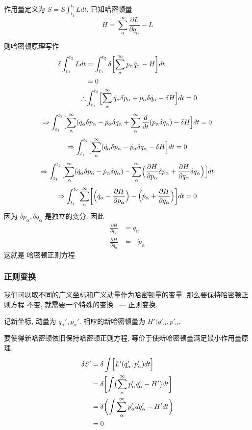 \documentclass{ctexart}
\begin{document}
作用量定义为 $S = S \int_{t_1}^{t_2} L dt$. 已知哈密顿量 
\[
H = \sum_{\alpha }^{\infty} \frac{\partial L}{\partial \dot{q}_\alpha} - L  
\] 

则哈密顿原理写作
\[
    \begin{align*}
        \delta \int_{t_1}^{t_2} Ldt 
	&= \int_{t_1}^{t_2} \delta \biggl[ \sum_{\alpha}^{\infty} 
	p_\alpha \dot{q}_\alpha - H \biggr] dt \\
	&= 0 \\ 
	\therefore &\int_{t_1}^{t_2} \Bigl[ \sum_{\alpha}^{\infty} 
	\dot{q}_\alpha \delta p_\alpha + p_\alpha \delta \dot{q}_\alpha 
    - \delta H \Bigr] dt =  0 \\ 
    \end{align*}
\] 
\[
\Rightarrow \int_{t_1}^{t_2} \Bigl[ \sum_{\alpha}^{\infty}
(\dot{q}_\alpha \delta p_\alpha - \dot{p}_\alpha \delta q_\alpha
+ \sum_{\alpha}^{\infty} \frac{d}{dt} (p_\alpha \delta q_\alpha ) - \delta H
\Bigr] dt =0
\] 
\[
\Rightarrow  \int_{t_1}^{t_2} \Bigl[ \sum_{\alpha}^{\infty} (\dot{q}_\alpha
\delta p_\alpha - \dot{p}_\alpha \delta q_\alpha - \delta H \Bigr]  dt 
=0
\] 
\[
\Rightarrow  \int_{t_1}^{t_2} \Bigl[ 
\sum_{\alpha}^{\infty}(\dot{q}_\alpha \delta p_\alpha - \dot{p}_\alpha \delta
q_\alpha ) 
- \sum_{\alpha}^{\infty} \Bigl( 
\frac{\partial H}{\partial p_\alpha} \delta p_\alpha + 
\frac{\partial H}{\partial q_\alpha} \delta q_\alpha 
\Bigr) 
\Bigr] dt 
\] 
\[
\Rightarrow \int_{t_1}^{t_2} 
\sum_{\alpha}^{\infty} \biggl[ 
\Bigl( \dot{q}_\alpha - \frac{\partial H}{\partial p_\alpha}  \Bigr) 
- 
\Bigl( \dot{p}_\alpha + \frac{\partial H}{\partial q_\alpha}  \Bigr)
\biggr]  dt 
=0
\] 
因为 $\delta p_\alpha, \delta q_\alpha$ 是独立的变分, 因此
\[
    \begin{align*}
        \frac{\partial H}{\partial p_\alpha} &= \dot{q}_\alpha \\
	\frac{\partial H}{\partial q_\alpha} &= - \dot{p}_\alpha
    \end{align*}
\] 
这就是 {\kaishu 哈密顿正则方程} 

\subsubsection{正则变换} 

我们可以取不同的广义坐标和广义动量作为哈密顿量的变量. 那么要保持哈密顿正则方程
不变, 就需要一个特殊的变换 ~--- 正则变换. 

记新坐标, 动量为 $q_\alpha', p_\alpha'$. 相应的新哈密顿量为 $H'(q'_\alpha,
p'_\alpha$. 

要使得新哈密顿依旧保持哈密顿正则方程, 等价于使新哈密顿量满足最小作用量原理. 
 \[
\begin{align*}
    \delta S' &= \delta \int \Bigl[ L'(q'_\alpha, p'_\alpha) dt \Bigr] \\ 
    &= \delta \biggl[ \int 
    \bigl(\sum_{\alpha}^{\infty}p'_\alpha \dot{q}'_\alpha - H'\bigr) dt \biggr] \\ 
    &= \delta \biggl( \int \sum_{\alpha}^{\infty}
    p_\alpha' dq_\alpha' - H' dt \biggr) \\ 
    &= 0 \\ 
\end{align*}
\] 
\end{document}
